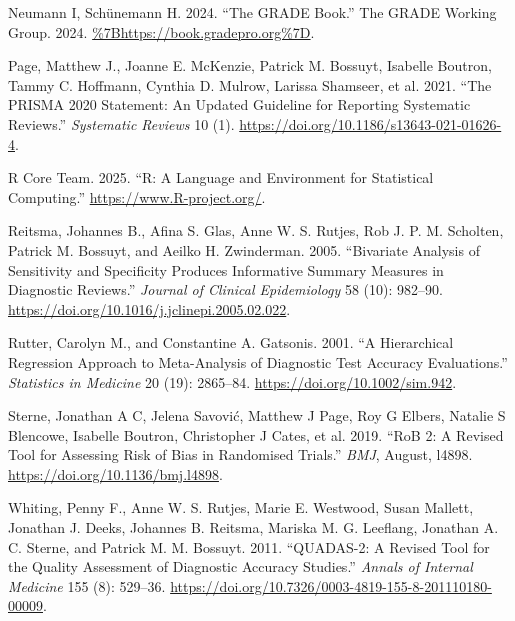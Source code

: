 \documentclass[
  11pt,
  a4paper,
  DIV=11,
  numbers=noendperiod]{scrreprt}
\newlength{\cslhangindent}
\newenvironment{CSLReferences}[2] %
 {\begin{list}{}{%
  \setlength{\itemindent}{0pt}
  \setlength{\leftmargin}{0pt}
  \setlength{\parsep}{0pt}
  \ifodd #1
   \setlength{\leftmargin}{\cslhangindent}
   \setlength{\itemindent}{-1\cslhangindent}
  \fi
  \setlength{\itemsep}{#2\baselineskip}}}
 {\end{list}}
\begin{document}
\begin{CSLReferences}{1}{0}
Neumann I, Schünemann H. 2024. {``{The GRADE Book}.''} The GRADE Working
Group. 2024. \url{\%7Bhttps://book.gradepro.org\%7D}.

Page, Matthew J., Joanne E. McKenzie, Patrick M. Bossuyt, Isabelle
Boutron, Tammy C. Hoffmann, Cynthia D. Mulrow, Larissa Shamseer, et al.
2021. {``The PRISMA 2020 Statement: An Updated Guideline for Reporting
Systematic Reviews.''} \emph{Systematic Reviews} 10 (1).
\url{https://doi.org/10.1186/s13643-021-01626-4}.

R Core Team. 2025. {``R: A Language and Environment for Statistical
Computing.''} \url{https://www.R-project.org/}.

Reitsma, Johannes B., Afina S. Glas, Anne W. S. Rutjes, Rob J. P. M.
Scholten, Patrick M. Bossuyt, and Aeilko H. Zwinderman. 2005.
{``Bivariate Analysis of Sensitivity and Specificity Produces
Informative Summary Measures in Diagnostic Reviews.''} \emph{Journal of
Clinical Epidemiology} 58 (10): 982--90.
\url{https://doi.org/10.1016/j.jclinepi.2005.02.022}.

Rutter, Carolyn M., and Constantine A. Gatsonis. 2001. {``A Hierarchical
Regression Approach to Meta{-}Analysis of Diagnostic Test Accuracy
Evaluations.''} \emph{Statistics in Medicine} 20 (19): 2865--84.
\url{https://doi.org/10.1002/sim.942}.

Sterne, Jonathan A C, Jelena Savović, Matthew J Page, Roy G Elbers,
Natalie S Blencowe, Isabelle Boutron, Christopher J Cates, et al. 2019.
{``RoB 2: A Revised Tool for Assessing Risk of Bias in Randomised
Trials.''} \emph{BMJ}, August, l4898.
\url{https://doi.org/10.1136/bmj.l4898}.

Whiting, Penny F., Anne W. S. Rutjes, Marie E. Westwood, Susan Mallett,
Jonathan J. Deeks, Johannes B. Reitsma, Mariska M. G. Leeflang, Jonathan
A. C. Sterne, and Patrick M. M. Bossuyt. 2011. {``QUADAS-2: A Revised
Tool for the Quality Assessment of Diagnostic Accuracy Studies.''}
\emph{Annals of Internal Medicine} 155 (8): 529--36.
\url{https://doi.org/10.7326/0003-4819-155-8-201110180-00009}.

\end{CSLReferences}
\end{document}
